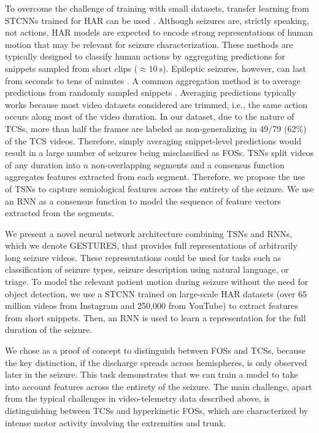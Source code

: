 To overcome the challenge of training with small datasets, transfer learning from \acp{STCNN} trained for \ac{HAR} can be used \cite{karacsony_deep_2020}.
Although seizures are, strictly speaking, not actions, \ac{HAR} models are expected to encode strong representations of human motion that may be relevant for seizure characterization.
These methods are typically designed to classify human actions by aggregating predictions for snippets sampled from short clips ($\approx \SI{10}{\second}$).
Epileptic seizures, however, can last from seconds to tens of minutes \cite{jenssen_how_2006}.
A common aggregation method is to average predictions from randomly sampled snippets \cite{carreira_quo_2017,ghadiyaram_large-scale_2019,simonyan_two-stream_2014}.
Averaging predictions typically works because most video datasets considered are trimmed, i.e., the same action occurs along most of the video duration.
In our dataset, due to the nature of \acp{TCS}, more than half the frames are labeled as non-generalizing in 49/79 (62\%) of the \ac{TCS} videos.
Therefore, simply averaging snippet-level predictions would result in a large number of seizures being misclassified as \acp{FOS}.
\Acp{TSN} \cite{wang_temporal_2019} split videos of any duration into $n$ non-overlapping segments and a consensus function aggregates features extracted from each segment.
Therefore, we propose the use of \acp{TSN} to capture semiological features across the entirety of the seizure.
We use an \ac{RNN} as a consensus function to model the sequence of feature vectors extracted from the segments.


We present a novel neural network architecture combining \acp{TSN} and \acp{RNN}, which we denote \ac{GESTURES}, that provides full representations of arbitrarily long seizure videos.
These representations could be used for tasks such as classification of seizure types, seizure description using natural language, or triage.
To model the relevant patient motion during seizure without the need for object detection, we use a \ac{STCNN} trained on large-scale \ac{HAR} datasets (over 65 million videos from Instagram and 250,000 from YouTube) \cite{ghadiyaram_large-scale_2019} to extract features from short snippets.
Then, an \ac{RNN} is used to learn a representation for the full duration of the seizure.

We chose as a proof of concept to distinguish between \acp{FOS} and \acp{TCS}, because the key distinction, if the discharge spreads across hemispheres, is only observed later in the seizure.
This task demonstrates that we can train a model to take into account features across the entirety of the seizure.
The main challenge, apart from the typical challenges in video-telemetry data described above, is distinguishing between \acp{TCS} and hyperkinetic \acp{FOS}, which are characterized by intense motor activity involving the extremities and trunk.
